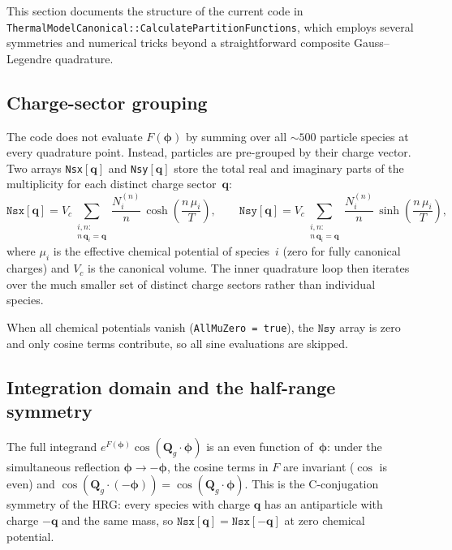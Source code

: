 \documentclass[11pt,a4paper]{article}
\newcommand{\bphi}{\bm{\phi}}
\newcommand{\bq}{\bm{q}}
\newcommand{\bQ}{\bm{Q}}
\begin{document}
This section documents the structure of the current code in \texttt{Thermal\-Model\-Canonical::Calculate\-Partition\-Functions}, which employs several symmetries and numerical tricks beyond a straightforward composite Gauss--Legendre quadrature.

\subsection{Charge-sector grouping}
\label{sec:charge-sector}

The code does not evaluate $F(\bphi)$ by summing over all $\sim 500$ particle species at every quadrature point.
Instead, particles are pre-grouped by their charge vector.
Two arrays \texttt{Nsx}$[\bq]$ and \texttt{Nsy}$[\bq]$ store the total real and imaginary parts of the multiplicity for each distinct charge sector~$\bq$:
\begin{equation}\label{eq:Nsx-Nsy}
  \texttt{Nsx}[\bq] = V_c \sum_{\substack{i,n:\\ n\,\bq_i = \bq}} \frac{N_i^{(n)}}{n}\,\cosh\!\left(\frac{n\,\mu_i}{T}\right),
  \qquad
  \texttt{Nsy}[\bq] = V_c \sum_{\substack{i,n:\\ n\,\bq_i = \bq}} \frac{N_i^{(n)}}{n}\,\sinh\!\left(\frac{n\,\mu_i}{T}\right),
\end{equation}
where $\mu_i$ is the effective chemical potential of species~$i$ (zero for fully canonical charges) and $V_c$ is the canonical volume.
The inner quadrature loop then iterates over the much smaller set of distinct charge sectors rather than individual species.

When all chemical potentials vanish (\texttt{AllMuZero = true}), the $\texttt{Nsy}$ array is zero and only cosine terms contribute, so all sine evaluations are skipped.

\subsection{Integration domain and the half-range symmetry}
\label{sec:integration-domain}

The full integrand $e^{F(\bphi)}\cos(\bQ_g \cdot \bphi)$ is an even function of~$\bphi$: under the simultaneous reflection $\bphi \to -\bphi$, the cosine terms in $F$ are invariant ($\cos$ is even) and $\cos(\bQ_g \cdot (-\bphi)) = \cos(\bQ_g \cdot \bphi)$.
This is the C-conjugation symmetry of the HRG: every species with charge $\bq$ has an antiparticle with charge $-\bq$ and the same mass, so $\texttt{Nsx}[\bq] = \texttt{Nsx}[-\bq]$ at zero chemical potential.
\end{document}
